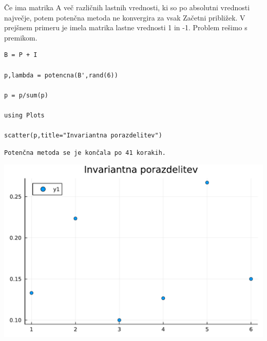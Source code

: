 \documentclass[12pt,a4paper]{article}
\begin{document}
Če ima matrika A več različnih lastnih vrednosti, ki so po absolutni vrednosti največje, potem potenčna metoda ne konvergira za vsak Začetni približek. V prejšnem primeru je imela matrika lastne vrednosti 1 in -1. Problem rešimo s premikom.


\begin{verbatim}
B = P + I

p,lambda = potencna(B',rand(6))

p = p/sum(p)

using Plots

scatter(p,title="Invariantna porazdelitev")
\end{verbatim}
\begin{verbatim}
Potenčna metoda se je končala po 41 korakih.
\end{verbatim}
\includegraphics[width=\linewidth]{jl_Go6zFm/demo_3_1.pdf}
\end{document}
